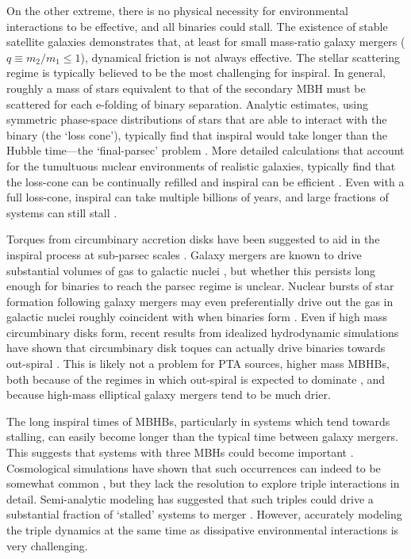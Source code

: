\documentclass[useAMS, usenatbib]{src/mnras}
\begin{document}
    On the other extreme, there is no physical necessity for environmental interactions to be effective, and all binaries could stall.  The existence of stable satellite galaxies demonstrates that, at least for small mass-ratio galaxy mergers ($q \equiv m_2/m_1 \leq 1$), dynamical friction is not always effective.  The stellar scattering regime is typically believed to be the most challenging for inspiral.  In general, roughly a mass of stars equivalent to that of the secondary MBH must be scattered for each e-folding of binary separation.  Analytic estimates, using symmetric phase-space distributions of stars that are able to interact with the binary (the `loss cone'), typically find that inspiral would take longer than the Hubble time---the `final-parsec' problem .  More detailed calculations that account for the tumultuous nuclear environments of realistic galaxies, typically find that the loss-cone can be continually refilled and inspiral can be efficient \needcite{}.  Even with a full loss-cone, inspiral can take multiple billions of years, and large fractions of systems can still stall .

    Torques from circumbinary accretion disks have been suggested to aid in the inspiral process at sub-parsec scales .  Galaxy mergers are known to drive substantial volumes of gas to galactic nuclei , but whether this persists long enough for binaries to reach the parsec regime is unclear.  Nuclear bursts of star formation following galaxy mergers may even preferentially drive out the gas in galactic nuclei roughly coincident with when binaries form .  Even if high mass circumbinary disks form, recent results from idealized hydrodynamic simulations have shown that circumbinary disk toques can actually drive binaries towards out-spiral .  This is likely not a problem for PTA sources, higher mass MBHBs, both because of the regimes in which out-spiral is expected to dominate , and because high-mass elliptical galaxy mergers tend to be much drier.

    The long inspiral times of MBHBs, particularly in systems which tend towards stalling, can easily become longer than the typical time between galaxy mergers.  This suggests that systems with three MBHs could become important .  Cosmological simulations have shown that such occurrences can indeed to be somewhat common , but they lack the resolution to explore triple interactions in detail.  Semi-analytic modeling has suggested that such triples could drive a substantial fraction of `stalled' systems to merger .  However, accurately modeling the triple dynamics at the same time as dissipative environmental interactions is very challenging.
\end{document}
